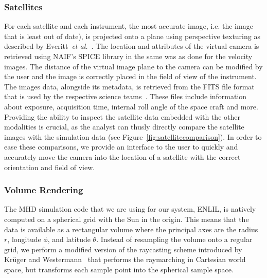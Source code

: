 \documentclass[journal]{vgtc}                %
\def\etal{\textit{et al.}}
\def\etal{\textit{et al.}}
\begin{document}
\subsubsection{Satellites} \label{sec:satelltes}
For each satellite and each instrument, the most accurate image, i.e. the image that is least out of date), is projected onto a plane using perspective texturing as described by Everitt~\etal~\cite{Everitt:2001tg}. The location and attributes of the virtual camera is retrieved using NAIF's SPICE library in the same was as done for the velocity images. The distance of the virtual image plane to the camera can be modified by the user and the image is correctly placed in the field of view of the instrument. The images data, alongside its metadata, is retrieved from the FITS file format that is used by the respective science teams~\cite{wells1981fits}. These files include information about exposure, acquisition time, internal roll angle of the space craft and more. Providing the ability to inspect the satellite data embedded with the other modalities is crucial, as the analyst can thusly directly compare the satellite images with the simulation data (see Figure~\ref{fig:satellitecomparison}). In order to ease these comparisons, we provide an interface to the user to quickly and accurately move the camera into the location of a satellite with the correct orientation and field of view.



\subsubsection{Volume Rendering} \label{sec:volumerendering}
The MHD simulation code that we are using for our system, ENLIL, is natively computed on a spherical grid with the Sun in the origin. This means that the data is available as a rectangular volume where the principal axes are the radius $r$, longitude $\phi$, and latitude $\theta$. Instead of resampling the volume onto a regular grid, we perform a modified version of the raycasting scheme introduced by Kr\"uger and Westermann~\cite{Kruger:2003ge} that performs the raymarching in Cartesian world space, but transforms each sample point into the spherical sample space.
\end{document}
